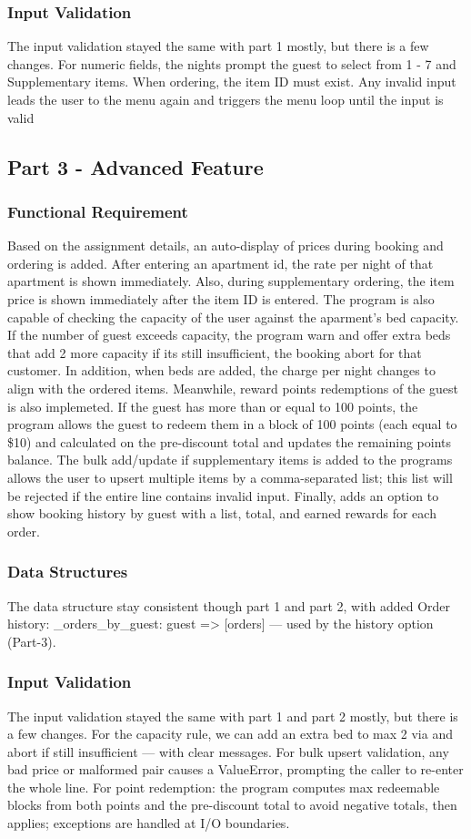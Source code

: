 \documentclass[conference]{IEEEtran}
\begin{document}
\subsubsection{Input Validation}
The input validation stayed the same with part 1 mostly, but there is a few changes. For numeric fields, the nights prompt the guest to select from 1 - 7 and Supplementary items. When ordering, the item ID must exist. Any invalid input leads the user to the menu again and triggers the menu loop until the input is valid
\subsection{Part 3 - Advanced Feature}
\subsubsection{Functional Requirement}
Based on the assignment details, an auto-display of prices during booking and ordering is added. After entering an apartment id, the rate per night of that apartment is shown immediately. Also, during supplementary ordering, the item price is shown immediately after the item ID is entered. The program is also capable of checking the capacity of the user against the aparment's bed capacity. If the number of guest exceeds capacity, the program warn and offer extra beds that add 2 more capacity if its still insufficient, the booking abort for that customer. In addition, when beds are added, the charge per night changes to align with the ordered items. Meanwhile, reward points redemptions of the guest is also implemeted. If the guest has more than or equal to 100 points, the program allows the guest to redeem them in a block of 100 points (each equal to \$10) and calculated on the pre-discount total and updates the remaining points balance. The bulk add/update if supplementary items is added to the programs allows the user to upsert multiple items by a comma-separated list; this list will be rejected if the entire line contains invalid input. Finally, adds an option to show booking history by guest with a list, total, and earned rewards for each order.
\subsubsection{Data Structures}
The data structure stay consistent though part 1 and part 2, with added Order history: \_orders\_by\_guest: guest => [orders] — used by the history option (Part-3).
\subsubsection{Input Validation}
The input validation stayed the same with part 1 and part 2 mostly, but there is a few changes. For the capacity rule, we can add an extra bed to max 2 via and abort if still insufficient — with clear messages.
For bulk upsert validation, any bad price or malformed pair causes a ValueError, prompting the caller to re-enter the whole line. For point redemption: the program computes max redeemable blocks from both points and the pre-discount total to avoid negative totals, then applies; exceptions are handled at I/O boundaries.
\end{document}
